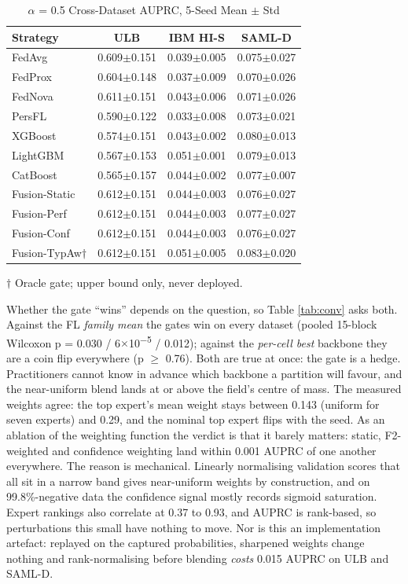 \documentclass[a4paper, 10pt, conference]{ieeeconf}
\begin{document}
\begin{table}[!tb]
\caption{$\alpha$ = 0.5 Cross-Dataset AUPRC, 5-Seed Mean $\pm$ Std}\label{tab:cross}
\centering\scriptsize
\setlength{\tabcolsep}{4pt}
\begin{tabular}{@{}lccc@{}}
\hline
\textbf{Strategy} & \textbf{ULB} & \textbf{IBM HI-S} & \textbf{SAML-D} \\ \hline
FedAvg & 0.609$\pm$0.151 & 0.039$\pm$0.005 & 0.075$\pm$0.027 \\
FedProx & 0.604$\pm$0.148 & 0.037$\pm$0.009 & 0.070$\pm$0.026 \\
FedNova & 0.611$\pm$0.151 & 0.043$\pm$0.006 & 0.071$\pm$0.026 \\
PersFL & 0.590$\pm$0.122 & 0.033$\pm$0.008 & 0.073$\pm$0.021 \\
XGBoost & 0.574$\pm$0.151 & 0.043$\pm$0.002 & 0.080$\pm$0.013 \\
LightGBM & 0.567$\pm$0.153 & 0.051$\pm$0.001 & 0.079$\pm$0.013 \\
CatBoost & 0.565$\pm$0.157 & 0.044$\pm$0.002 & 0.077$\pm$0.007 \\
Fusion-Static & 0.612$\pm$0.151 & 0.044$\pm$0.003 & 0.076$\pm$0.027 \\
Fusion-Perf & 0.612$\pm$0.151 & 0.044$\pm$0.003 & 0.077$\pm$0.027 \\
Fusion-Conf & 0.612$\pm$0.151 & 0.044$\pm$0.003 & 0.076$\pm$0.027 \\
Fusion-TypAw$\dagger$ & 0.612$\pm$0.151 & 0.051$\pm$0.005 & 0.083$\pm$0.020 \\ \hline
\end{tabular}
\par\smallskip\raggedright\scriptsize $\dagger$ Oracle gate; upper bound only, never deployed.
\end{table}

Whether the gate ``wins'' depends on the question, so Table \ref{tab:conv} asks
both. Against the FL \emph{family mean} the gates win on every dataset (pooled
15-block Wilcoxon p = 0.030 / 6$\times$10\textsuperscript{$-$5} / 0.012);
against the \emph{per-cell best} backbone they are a coin flip everywhere
(p $\ge$ 0.76). Both are true at once: the gate is a hedge. Practitioners cannot
know in advance which backbone a partition will favour, and the near-uniform
blend lands at or above the field's centre of mass. The measured weights agree:
the top expert's mean weight stays between 0.143 (uniform for seven experts) and
0.29, and the nominal top expert flips with the seed. As an ablation of the
weighting function the verdict is that it barely matters: static, F2-weighted
and confidence weighting land within 0.001 AUPRC of one another everywhere. The
reason is mechanical. Linearly normalising validation scores that all sit in a
narrow band gives near-uniform weights by construction, and on 99.8\%-negative
data the confidence signal mostly records sigmoid saturation. Expert rankings
also correlate at 0.37 to 0.93, and AUPRC is rank-based, so perturbations this
small have nothing to move. Nor is this an implementation artefact: replayed on
the captured probabilities, sharpened weights change nothing and rank-normalising
before blending \emph{costs} 0.015 AUPRC on ULB and SAML-D.
\end{document}
